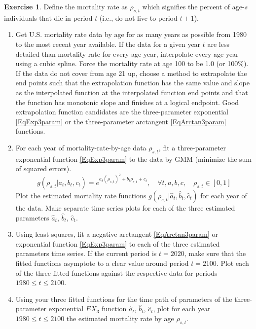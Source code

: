 \documentclass[letterpaper,12pt]{article}
\theoremstyle{definition}
\newtheorem{exercise}[theorem]{Exercise}
\begin{document}
  \begin{exercise}\label{ExMortEst}
    Define the mortality rate as $\rho_{s,t}$ which signifies the percent of age-$s$ individuals that die in period $t$ (i.e., do not live to period $t+1$).
    \begin{enumerate}
      \item Get U.S. mortality rate data by age for as many years as possible from 1980 to the most recent year available. If the data for a given year $t$ are less detailed than mortality rate for every age year, interpolate every age year using a cubic spline. Force the mortality rate at age 100 to be 1.0 (or 100\%). If the data do not cover from age 21 up, choose a method to extrapolate the end points such that the extrapolation function has the same value and slope as the interpolated function at the interpolated function end points and that the function has monotonic slope and finishes at a logical endpoint. Good extrapolation function candidates are the three-parameter exponential \eqref{EqExp3param} or the three-parameter arctangent \eqref{EqArctan3param} functions.
      \item For each year of mortality-rate-by-age data $\rho_{s,t}$, fit a three-parameter exponential function \eqref{EqExp3param} to the data by GMM (minimize the sum of squared errors).
      \begin{equation}\label{EqMort3param}
        g(\rho_{s,t}|a_t,b_t,c_t) = e^{a_t(\rho_{s,t})^2 + b_t\rho_{s,t} + c_t}, \quad\forall t,a,b,c,\quad \rho_{s,t}\in[0,1]
      \end{equation}
      Plot the estimated mortality rate functions $g(\rho_{s,t}|\hat{a}_t,\hat{b}_t,\hat{c}_t)$ for each year of the data. Make separate time series plots for each of the three estimated parameters $\hat{a}_t$, $\hat{b}_t$, $\hat{c}_t$.
      \item Using least squares, fit a negative arctangent \eqref{EqArctan3param} or exponential function \eqref{EqExp3param} to each of the three estimated parameters time series. If the current period is $t=2020$, make sure that the fitted functions asymptote to a clear value around period $t=2100$. Plot each of the three fitted functions against the respective data for periods $1980\leq t\leq 2100$.
      \item Using your three fitted functions for the time path of parameters of the three-parameter exponential $EX_3$ function $\hat{a}_t$, $\hat{b}_t$, $\hat{c}_t$, plot for each year $1980\leq t\leq 2100$ the estimated mortality rate by age $\rho_{s,t}$.
    \end{enumerate}
  \end{exercise}
\end{document}
